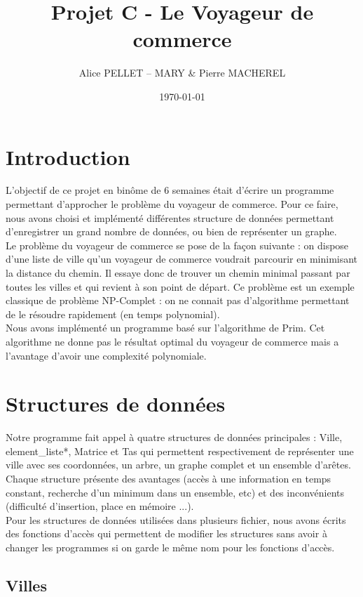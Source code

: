 \documentclass[a4paper,11pt]{article}
\date{\today}
\title{Projet C - Le Voyageur de commerce}
\author{Alice PELLET -- MARY \& Pierre MACHEREL}
\begin{document}
\maketitle
\tableofcontents

\section*{Introduction} %

L'objectif de ce projet en binôme de 6 semaines était d'écrire un programme permettant d'approcher le problème du voyageur de commerce. Pour ce faire, nous avons choisi et implémenté différentes structure de données permettant d'enregistrer un grand nombre de données, ou bien de représenter un graphe.\\
Le problème du voyageur de commerce se pose de la façon suivante : on dispose d'une liste de ville qu'un voyageur de commerce voudrait parcourir en minimisant la distance du chemin. Il essaye donc de trouver un chemin minimal passant par toutes les villes et qui revient à son point de départ. Ce problème est un exemple classique de problème NP-Complet : on ne connait pas d'algorithme permettant de le résoudre rapidement (en temps polynomial).\\
Nous avons implémenté un programme basé sur l'algorithme de Prim. Cet algorithme ne donne pas le résultat optimal du voyageur de commerce mais a l'avantage d'avoir une complexité polynomiale.

\section{Structures de données}
Notre programme fait appel à quatre structures de données principales : \textsf{Ville}, \textsf{element\_liste*}, \textsf{Matrice} et \textsf{Tas} qui permettent respectivement de représenter une ville avec ses coordonnées, un arbre, un graphe complet et un ensemble d'arêtes.
Chaque structure présente des avantages (accès à une information en temps constant, recherche d'un minimum dans un ensemble, etc) et des inconvénients (difficulté d'insertion, place en mémoire ...).\\
Pour les structures de données utilisées dans plusieurs fichier, nous avons écrits des fonctions d'accès qui permettent de modifier les structures sans avoir à changer les programmes si on garde le même nom pour les fonctions d'accès.

\subsection{Villes}
\end{document}
